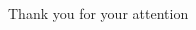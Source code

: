 \STANDARD{}
{
  \begin{columns}
    \begin{column}{0.35\textwidth}
      \begin{block}{~~~~~~Thank you}
        \centering
        for your attention
      \end{block}
    \end{column}
  \end{columns}
}


